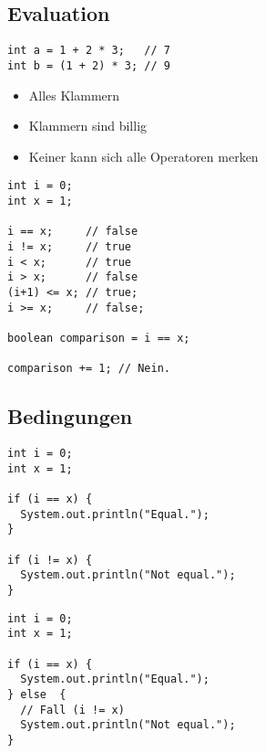 \documentclass{beamer}
\begin{document}
\subsection{Evaluation}
\begin{frame}[fragile]{\subsecname}
  \begin{lstlisting}
int a = 1 + 2 * 3;   // 7
int b = (1 + 2) * 3; // 9
  \end{lstlisting}
  \begin{itemize}
  \item Alles Klammern
  \item Klammern sind billig
  \item Keiner kann sich alle Operatoren merken
  \end{itemize}
\end{frame}

\begin{frame}[fragile]{\subsecname}
  \begin{lstlisting}
int i = 0;
int x = 1;

i == x;     // false
i != x;     // true
i < x;      // true
i > x;      // false
(i+1) <= x; // true;
i >= x;     // false;

boolean comparison = i == x;

comparison += 1; // Nein.
  \end{lstlisting}
\end{frame}

\subsection{Bedingungen}
\begin{frame}[fragile]{\subsecname}
  \begin{lstlisting}
int i = 0;
int x = 1;

if (i == x) {
  System.out.println("Equal.");
}

if (i != x) {
  System.out.println("Not equal.");
}
  \end{lstlisting}
\end{frame}

\begin{frame}[fragile]{\subsecname}
  \begin{lstlisting}
int i = 0;
int x = 1;

if (i == x) {
  System.out.println("Equal.");
} else  {
  // Fall (i != x)
  System.out.println("Not equal.");
}
  \end{lstlisting}
\end{frame}
\end{document}
